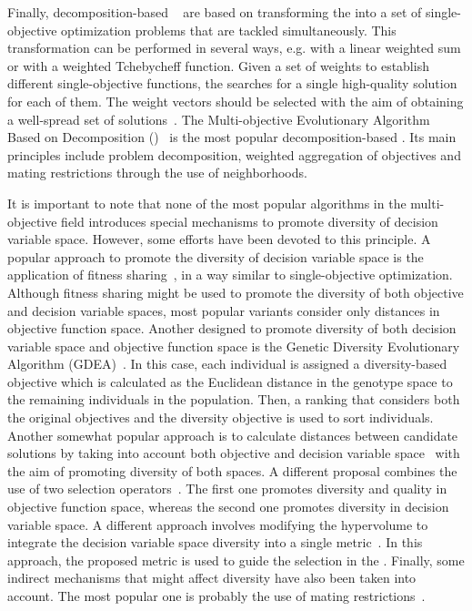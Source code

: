 Finally, decomposition-based \MOEAS{}~\cite{Joel:MOEAD_AMS} are based on transforming the \MOP{} into a set of 
single-objective optimization problems that are tackled simultaneously.
%
This transformation can be performed in several ways, e.g. with a linear weighted sum or with a weighted Tchebycheff function. 
%
Given a set of weights to establish different single-objective functions, the \MOEA{} searches for a single 
high-quality solution for each of them. 
%
The weight vectors should be selected with the aim of obtaining a well-spread set of solutions~\cite{Joel:Kalyanmoy}.
%
The Multi-objective Evolutionary Algorithm Based on Decomposition (\MOEAD{})~\cite{Joel:MOEAD} is the most popular 
decomposition-based \MOEA{}. 
%
Its main principles include problem decomposition, weighted aggregation of objectives and mating restrictions 
through the use of neighborhoods. 

It is important to note that none of the most popular algorithms in the multi-objective field introduces special 
mechanisms to promote diversity of decision variable space.
%
However, some efforts have been devoted to this principle.
%
A popular approach to promote the diversity of decision variable space is the application of fitness sharing~\cite{Joel:NPGA}, 
in a way similar to single-objective optimization.
%
Although fitness sharing might be used to promote the diversity of both objective and decision variable spaces, most
popular variants consider only distances in objective function space.
% 
Another \MOEA{} designed to promote diversity of both decision variable space and objective function space is the Genetic
Diversity Evolutionary Algorithm (GDEA)~\cite{toffolo2003genetic}.
%
In this case, each individual is assigned a diversity-based objective which is calculated as the
Euclidean distance in the genotype space to the remaining individuals in the population.
%
Then, a ranking that considers both the original objectives and the diversity objective is used
to sort individuals.
%
Another somewhat popular approach is to calculate distances between candidate solutions by taking
into account both objective and decision variable space~\cite{deb2005omni,shir2009enhancing} with the aim
of promoting diversity of both spaces.
%
A different proposal combines the use of two selection operators~\cite{chan2005evolutionary}.
%
The first one promotes diversity and quality in objective function space, whereas the second one promotes diversity 
in decision variable space.
%
A different approach involves modifying the hypervolume to integrate the decision variable space diversity 
into a single metric~\cite{ulrich2010integrating}.
% 
In this approach, the proposed metric is used to guide the selection in the \MOEA{}.
%
Finally, some indirect mechanisms that might affect diversity have also been taken into account.
%
The most popular one is probably the use of mating restrictions~\cite{Joel:STUDY_MATTING_RESTRICTION,Joel:MOEAD_AMS}.


